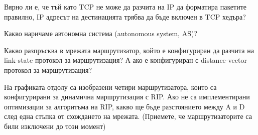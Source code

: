 \begin{questions}
  \question Вярно ли е, че тъй като TCP не може да разчита на IP да форматира
  пакетите правилно, IP адресът на дестинацията трябва да бъде включен в TCP
  хедъра?

  \question Какво наричаме автономна система
  (\foreignlanguage{english}{autonomous system, AS})?

  \question Какво разпръсква в мрежата маршрутизатор, който е конфигуриран да
  разчита на \foreignlanguage{english}{link-state} протокол за маршрутизация? А
  ако е конфигуриран с \foreignlanguage{english}{distance-vector} протокол за
  маршрутизация?

  \question[7] На графиката отдолу са изобразени четири маршрутизатора, които са
  конфигурирани за динамична маршрутизация с RIP. Ако не са имплементирани
  оптимизации за алгоритъма на RIP, какво ще бъде разстоянието между A и
  D след една стъпка от схождането на мрежата. (Приемете, че маршрутизаторите са
  били изключени до този момент)

  \begin{center}
  \end{center}
\end{questions}

